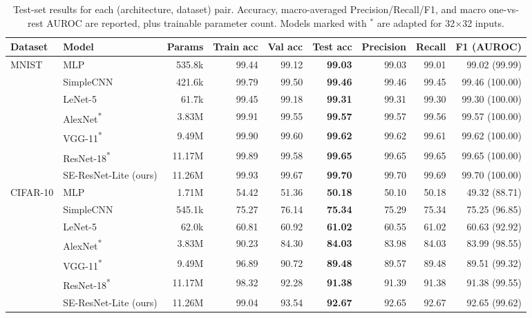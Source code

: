 \begin{table}[t]
\centering
\caption{Test-set results for each (architecture, dataset) pair. Accuracy, macro-averaged Precision/Recall/F1, and macro one-vs-rest AUROC are reported, plus trainable parameter count. Models marked with $^{*}$ are adapted for 32$\times$32 inputs.}
\label{tab:main}
\setlength{\tabcolsep}{4pt}
\small
\begin{tabular}{llrrrrrrr}
\toprule
Dataset & Model & Params & Train acc & Val acc & Test acc & Precision & Recall & F1 (AUROC) \\
\midrule
MNIST & MLP & 535.8k & 99.44 & 99.12 & \textbf{99.03} & 99.03 & 99.01 & 99.02 (99.99) \\
 & SimpleCNN & 421.6k & 99.79 & 99.50 & \textbf{99.46} & 99.46 & 99.45 & 99.46 (100.00) \\
 & LeNet-5 & 61.7k & 99.45 & 99.18 & \textbf{99.31} & 99.31 & 99.30 & 99.30 (100.00) \\
 & AlexNet\textsuperscript{*} & 3.83M & 99.91 & 99.55 & \textbf{99.57} & 99.57 & 99.56 & 99.57 (100.00) \\
 & VGG-11\textsuperscript{*} & 9.49M & 99.90 & 99.60 & \textbf{99.62} & 99.62 & 99.61 & 99.62 (100.00) \\
 & ResNet-18\textsuperscript{*} & 11.17M & 99.89 & 99.58 & \textbf{99.65} & 99.65 & 99.65 & 99.65 (100.00) \\
 & SE-ResNet-Lite (ours) & 11.26M & 99.93 & 99.67 & \textbf{99.70} & 99.70 & 99.69 & 99.70 (100.00) \\
\midrule
CIFAR-10 & MLP & 1.71M & 54.42 & 51.36 & \textbf{50.18} & 50.10 & 50.18 & 49.32 (88.71) \\
 & SimpleCNN & 545.1k & 75.27 & 76.14 & \textbf{75.34} & 75.29 & 75.34 & 75.25 (96.85) \\
 & LeNet-5 & 62.0k & 60.81 & 60.92 & \textbf{61.02} & 60.55 & 61.02 & 60.63 (92.92) \\
 & AlexNet\textsuperscript{*} & 3.83M & 90.23 & 84.30 & \textbf{84.03} & 83.98 & 84.03 & 83.99 (98.55) \\
 & VGG-11\textsuperscript{*} & 9.49M & 96.89 & 90.72 & \textbf{89.48} & 89.57 & 89.48 & 89.51 (99.32) \\
 & ResNet-18\textsuperscript{*} & 11.17M & 98.32 & 92.28 & \textbf{91.38} & 91.39 & 91.38 & 91.38 (99.55) \\
 & SE-ResNet-Lite (ours) & 11.26M & 99.04 & 93.54 & \textbf{92.67} & 92.65 & 92.67 & 92.65 (99.62) \\
\bottomrule
\end{tabular}
\end{table}
